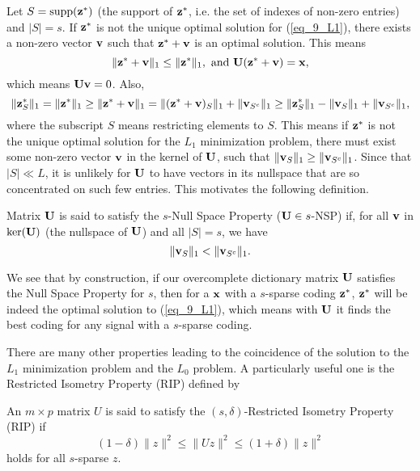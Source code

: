 \documentclass[../main.tex]{subfiles}
\begin{document}
\par Let $S={\rm supp}({\bf z}^*)$ (the support of ${\bf z}^*$, i.e. the set of indexes of non-zero entries) and $|S|=s$. If ${\bf z}^*$ is not the unique optimal solution for (\ref{eq_9_L1}), there exists a non-zero vector ${\bf v}$ such that ${\bf z^*+v}$ is an optimal solution. This means
\begin{equation*}
\|{\bf z^*+v}\|_1\leq \|{\bf z}^*\|_1,\text{ and }{\bf U(z^*+v)}={\bf x},
\end{equation*}
which means ${\bf Uv}=0$. Also,
\begin{equation*}
\|{\bf z}^*_S\|_1 = \|{\bf z}^*\|_1 \geq \|{\bf z^*+v}\|_1 = 	\|({\bf z^*+v})_S\|_1 + \|{\bf v}_{S^c}\|_1 \geq \|{\bf z}^*_S\|_1 - \|{\bf v}_S\|_1 + \|{\bf v}_{S^c}\|_1,
\end{equation*}
where the subscript $S$ means restricting elements to $S$. This means if ${\bf z}^*$ is not the unique optimal solution for the $L_1$ minimization problem, there must exist some non-zero vector ${\bf v}$ in the kernel of ${\bf U}$, such that $\|{\bf v}_S\|_1\geq \|{\bf v}_{S^c}\|_1$. Since that $|S|\ll L$, it is unlikely for ${\bf U}$ to have vectors in its nullspace that are so concentrated on such few entries. This motivates the following definition.
\begin{definition}
	Matrix ${\bf U}$ is said to satisfy the $s$-Null Space Property (${\bf U}\in s$-NSP) if, for all ${\bf v}$ in ${\rm ker}({\bf U})$ (the nullspace of ${\bf U}$) and all $|S|=s$, we have
	\begin{equation*}
	\|{\bf v}_{S}\|_1<\|{\bf v}_{S^c}\|_1.
	\end{equation*}
\end{definition}
We see that by construction, if our overcomplete dictionary matrix ${\bf U}$ satisfies the Null Space Property for $s$, then for a ${\bf x}$ with a $s$-sparse coding ${\bf z}^*$, ${\bf z}^*$ will be indeed the optimal solution to (\ref{eq_9_L1}), which means with ${\bf U}$ it finds the best coding for any signal with a $s$-sparse coding.
\par There are many other properties leading to the coincidence of the solution to the $L_1$ minimization problem and the $L_0$ problem. A particularly useful one is the Restricted Isometry Property (RIP) defined by
\begin{definition}\label{def_9_RIP}
	An $m\times p$ matrix $U$ is said to satisfy the $(s,\delta)$-Restricted Isometry Property (RIP) if 
	\begin{equation*}
	(1-\delta)\|z\|^2\leq \|Uz\|^2\leq (1+\delta)\|z\|^2
	\end{equation*}
	holds for all $s$-sparse $z$.
\end{definition}
\end{document}

